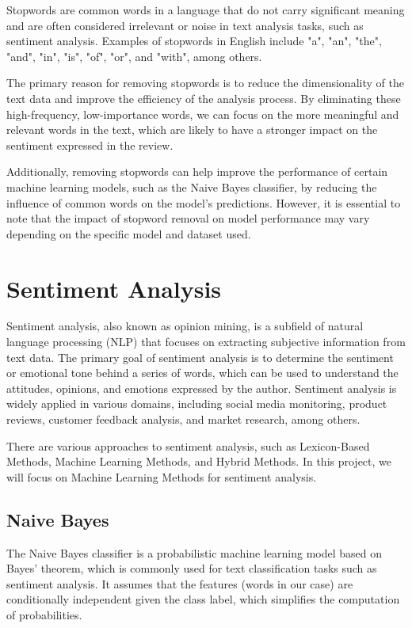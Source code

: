 \documentclass{article}
\begin{document}
Stopwords are common words in a language that do not carry significant meaning and are often considered irrelevant or noise in text analysis tasks, such as sentiment analysis. Examples of stopwords in English include "a", "an", "the", "and", "in", "is", "of", "or", and "with", among others.

The primary reason for removing stopwords is to reduce the dimensionality of the text data and improve the efficiency of the analysis process. By eliminating these high-frequency, low-importance words, we can focus on the more meaningful and relevant words in the text, which are likely to have a stronger impact on the sentiment expressed in the review.

Additionally, removing stopwords can help improve the performance of certain machine learning models, such as the Naive Bayes classifier, by reducing the influence of common words on the model's predictions. However, it is essential to note that the impact of stopword removal on model performance may vary depending on the specific model and dataset used.

\section{Sentiment Analysis}

Sentiment analysis, also known as opinion mining, is a subfield of natural language processing (NLP) that focuses on extracting subjective information from text data. The primary goal of sentiment analysis is to determine the sentiment or emotional tone behind a series of words, which can be used to understand the attitudes, opinions, and emotions expressed by the author. Sentiment analysis is widely applied in various domains, including social media monitoring, product reviews, customer feedback analysis, and market research, among others.

There are various approaches to sentiment analysis, such as Lexicon-Based Methods, Machine Learning Methods, and Hybrid Methods. In this project, we will focus on Machine Learning Methods for sentiment analysis.

\subsection{Naive Bayes}

The Naive Bayes classifier is a probabilistic machine learning model based on Bayes' theorem, which is commonly used for text classification tasks such as sentiment analysis. It assumes that the features (words in our case) are conditionally independent given the class label, which simplifies the computation of probabilities.
\end{document}
